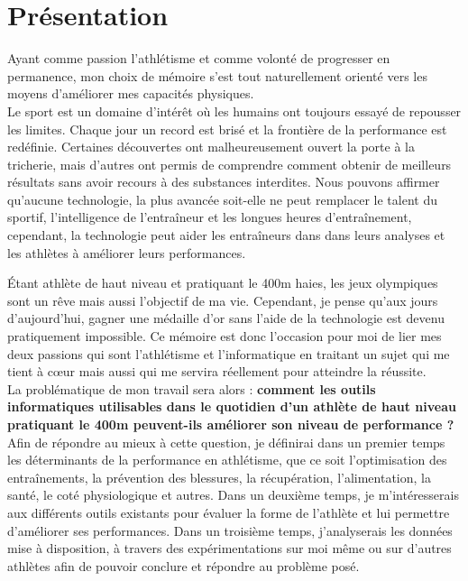 \chapter*{Présentation}
\label{chap:introduction}

Ayant comme passion l'athlétisme et comme volonté de progresser en permanence, mon choix de mémoire s'est tout naturellement orienté vers les moyens d'améliorer mes capacités physiques.\\

Le sport est un domaine d'intérêt où les humains ont toujours essayé de repousser les limites. Chaque jour un record est brisé et la frontière de la performance est redéfinie.
Certaines découvertes ont malheureusement ouvert la porte à la tricherie, mais d’autres ont permis de comprendre comment obtenir de meilleurs résultats sans avoir recours à des substances interdites.  Nous pouvons affirmer qu'aucune technologie, la plus avancée soit-elle ne peut remplacer le talent du sportif, l'intelligence de l’entraîneur et les longues heures d’entraînement, cependant, la technologie  peut aider les entraîneurs  dans dans leurs analyses et les athlètes à améliorer leurs performances.

Étant athlète de haut niveau et pratiquant le 400m haies, les jeux olympiques sont un rêve mais aussi l'objectif de ma vie. Cependant, je pense qu'aux jours d'aujourd'hui, gagner une médaille d'or sans l'aide de la technologie est devenu pratiquement impossible.  Ce mémoire est donc l'occasion pour moi de lier mes deux passions  qui sont l'athlétisme et l'informatique en traitant un sujet qui me tient à cœur mais aussi qui me servira réellement pour atteindre la réussite.\\

La problématique de mon travail sera alors : \textbf{comment les outils informatiques utilisables dans le quotidien d'un athlète de haut niveau pratiquant le 400m peuvent-ils améliorer son niveau de performance ?} \\

Afin de répondre au mieux à cette question, je définirai dans un premier temps les déterminants de la performance en athlétisme, que ce soit l'optimisation des entraînements, la prévention des blessures, la récupération, l'alimentation, la santé, le coté physiologique et autres.
Dans un deuxième temps, je m’intéresserais aux différents outils existants pour évaluer la forme de l'athlète et lui permettre d'améliorer ses performances.
Dans un troisième temps, j'analyserais les données mise à disposition, à travers des expérimentations sur moi même ou sur d'autres athlètes afin de pouvoir conclure et répondre au problème posé.\\


